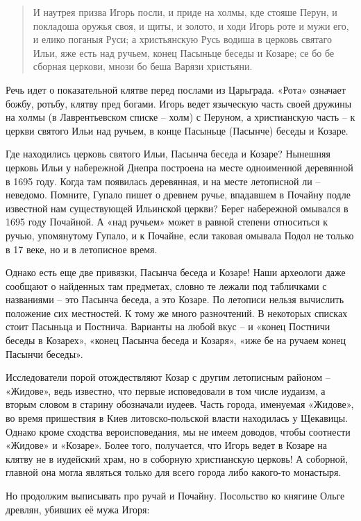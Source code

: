 \begin{quotation}
И наутрея призва Игорь посли, и приде на холмы, кде стояше Перун, и покладоша оружья своя, и щиты, и золото, и ходи Игорь роте и мужи его, и елико поганыя Руси; а христьянскую Русь водиша в церковь святаго Ильи, яже есть над ручьем, конец Пасыньце беседы и Козаре; се бо бе сборная церкови, мнози бо беша Варязи христьяни.
\end{quotation}

Речь идет о показательной клятве перед послами из Царьграда. «Рота» означает божбу, ротьбу, клятву пред богами. Игорь ведет языческую часть своей дружины на холмы (в Лаврентьевском списке – холм) с Перуном, а христианскую часть – к церкви святого Ильи над ручьем, в конце Пасыньце (Пасынче) беседы и Козаре.   

Где находились церковь святого Ильи, Пасынча беседа и Козаре? Нынешняя церковь Ильи у набережной Днепра построена на месте одноименной деревянной в 1695 году. Когда там появилась деревянная, и на месте летописной ли – неведомо. Помните, Гупало пишет о древнем ручье, впадавшем в Почайну подле известной нам существующей Ильинской церкви? Берег набережной омывался в 1695 году Почайной. А «над ручьем» может в равной степени относиться к ручью, упомянутому Гупало, и к Почайне, если таковая омывала Подол не только в 17 веке, но и в летописное время.

Однако есть еще две привязки, Пасынча беседа и Козаре! Наши археологи даже сообщают о найденных там предметах, словно те лежали под табличками с названиями – это Пасынча беседа, а это Козаре. По летописи нельзя вычислить положение сих местностей. К тому же много разночтений. В некоторых списках стоит Пасыньца и Постнича. Варианты на любой вкус – и «конец Постничи беседы в Козарех», «конец Пасынча беседа и Козаря», «иже бе на ручаем конец Пасынчи беседы».

Исследователи порой отождествляют Козар с другим летописным районом – «Жидове», ведь известно, что первые исповедовали в том числе иудаизм, а вторым словом в старину обозначали иудеев. Часть города, именуемая «Жидове», во время пришествия в Киев литовско-польской власти находилась у Щекавицы. Однако кроме сходства вероисповедания, мы не имеем доводов, чтобы соотнести «Жидове» и «Козаре». Более того, получается, что Игорь ведет в Козаре на клятву не в иудейский храм, но в соборную христианскую церковь! А соборной, главной она могла являться только для всего города либо какого-то монастыря. 

Но продолжим выписывать про ручай и Почайну. Посольство ко княгине Ольге древлян, убивших её мужа Игоря:

